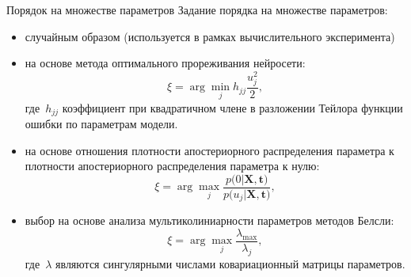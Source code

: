 \documentclass[10pt,pdf,hyperref={unicode}]{beamer}
\begin{document}
\begin{frame}{Порядок на множестве параметров}
Задание порядка на множестве параметров:
\begin{itemize}
	\item случайным образом (используется в рамках вычислительного эксперимента)
	\item на основе метода оптимального прореживания нейросети:
	\[
	\xi = \arg \min_{j} h_{jj}\frac{u_j^2}{2},
	\]
	где~$h_{jj}$ коэффициент при квадратичном члене в разложении Тейлора функции ошибки по параметрам модели.
	\item на основе отношения плотности апостериорного распределения параметра к плотности апостериорного распределения параметра к нулю:
	\[
	\xi = \arg \max_{j} \frac{p\bigr(0|\mathbf{X}, \mathbf{t}\bigr)}{p\bigr(u_j|\mathbf{X}, \mathbf{t}\bigr)},
	\]
	\item выбор на основе анализа мультиколиниарности параметров методов Белсли:
	\[
	\xi = \arg \max_{j} \frac{\lambda_{\max}}{\lambda_{j}}, 
	\]
	где~$\lambda$ являются сингулярными числами ковариационный матрицы параметров.
\end{itemize}
\end{frame}
\end{document}
